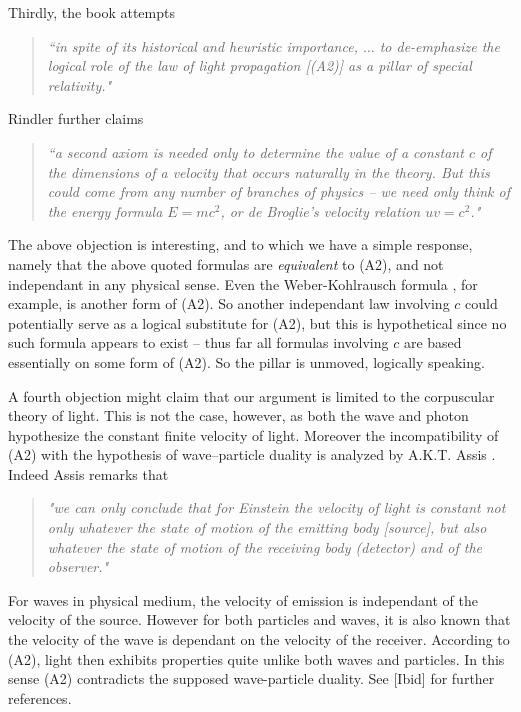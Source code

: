 \documentclass[12pt]{amsart}
\theoremstyle{definition}
\theoremstyle{remark}
\begin{document}
Thirdly, the book \cite[pp.8-10, 21-22]{rindler} attempts 
\begin{quote}
\emph{``in spite of its historical and heuristic importance, $\ldots$ to de-emphasize the logical role of the law of light propagation [(A2)] as a pillar of special relativity."}
\end{quote}
Rindler further claims 
\begin{quote}
\emph{``a second axiom is needed \emph{only} to determine the value of a constant $c$ of the dimensions of a velocity that occurs naturally in the theory. But this could come from any number of branches of physics -- we need only think of the energy formula $E=mc^2$, or de Broglie's velocity relation $u v =c^2$." }
\end{quote}
The above objection is interesting, and to which we have a simple response, namely that the above quoted formulas are \emph{equivalent} to (A2), and not independant in any physical sense. Even the Weber-Kohlrausch formula \cite{awk}, for example, is another form of (A2). So another independant law involving $c$ could potentially serve as a logical substitute for (A2), but this is hypothetical since no such formula appears to exist -- thus far all formulas involving $c$ are based essentially on some form of (A2). So the pillar is unmoved, logically speaking.  

A fourth objection might claim that our argument is limited to the corpuscular theory of light. This is not the case, however, as both the wave and photon hypothesize the constant finite velocity of light.  Moreover the incompatibility of (A2) with the hypothesis of wave--particle duality is analyzed by A.K.T. Assis \cite[\S 7.2.4, pp.133]{assis1999relational}. Indeed Assis remarks that 
\begin{quote} \emph{"we can only conclude that for Einstein the velocity of light is constant not only whatever the state of motion of the emitting body [source], but also whatever the state of motion of the receiving body (detector) and of the observer."} 
\end{quote}
For waves in physical medium, the velocity of emission is independant of the velocity of the source. However for both particles and waves, it is also known that the velocity of the wave is dependant on the velocity of the receiver. According to (A2), light then exhibits properties quite unlike both waves and particles. In this sense (A2) contradicts the supposed wave-particle duality. See [Ibid] for further references. 
\end{document}
